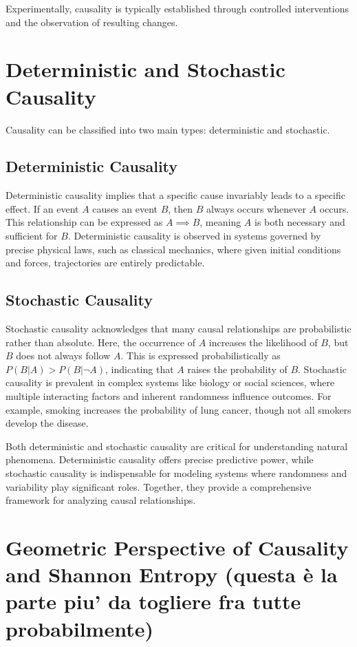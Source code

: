 \documentclass[English, Lau, oneside]{sapthesis}
\begin{document}
Experimentally, causality is typically established through controlled interventions and the observation of resulting changes.
\newpage
\section{Deterministic and Stochastic Causality}

\noindent Causality can be classified into two main types: deterministic and stochastic.

\subsection{Deterministic Causality}

\noindent Deterministic causality implies that a specific cause invariably leads to a specific effect. If an event \( A \) causes an event \( B \), then \( B \) always occurs whenever \( A \) occurs. This relationship can be expressed as \( A \implies B \), meaning \( A \) is both necessary and sufficient for \( B \). Deterministic causality is observed in systems governed by precise physical laws, such as classical mechanics, where given initial conditions and forces, trajectories are entirely predictable.

\subsection{Stochastic Causality}

\noindent Stochastic causality acknowledges that many causal relationships are probabilistic rather than absolute. Here, the occurrence of \( A \) increases the likelihood of \( B \), but \( B \) does not always follow \( A \). This is expressed probabilistically as \( P(B|A) > P(B|\neg A) \), indicating that \( A \) raises the probability of \( B \). Stochastic causality is prevalent in complex systems like biology or social sciences, where multiple interacting factors and inherent randomness influence outcomes. For example, smoking increases the probability of lung cancer, though not all smokers develop the disease.

Both deterministic and stochastic causality are critical for understanding natural phenomena. Deterministic causality offers precise predictive power, while stochastic causality is indispensable for modeling systems where randomness and variability play significant roles. Together, they provide a comprehensive framework for analyzing causal relationships.
\newpage
\section{Geometric Perspective of Causality and Shannon Entropy (questa è la parte piu' da togliere fra tutte probabilmente)}
\end{document}
